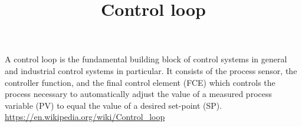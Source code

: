 \documentclass[a4paper]{article}
\title{Control loop}
\date{}
\begin{document}
    \maketitle
    A control loop is the fundamental building block of control systems in general and industrial control systems in particular. It consists of the process sensor, the controller function, and the final control element (FCE) which controls the process necessary to automatically adjust the value of a measured process variable (PV) to equal the value of a desired set-point (SP).
    \url{https://en.wikipedia.org/wiki/Control_loop}
\end{document}
